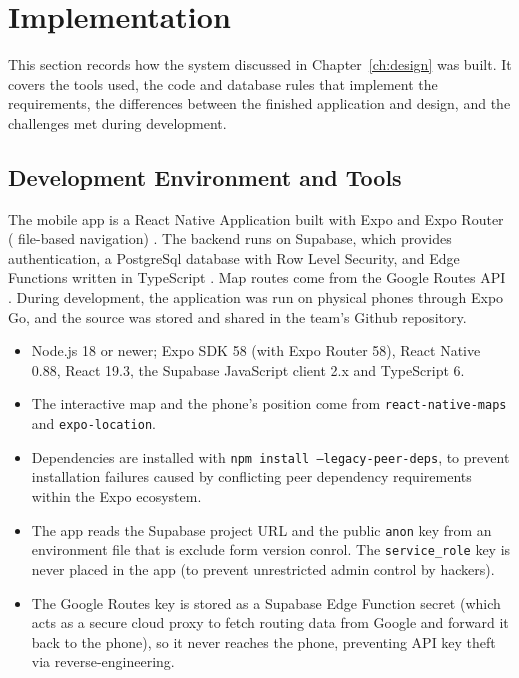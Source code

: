 \chapter{Implementation}
\label{ch:implementation}

This section records how the system discussed in Chapter~\ref{ch:design} was built. It covers the tools used, the code and database rules that implement the requirements, the differences between the finished application and design, and the challenges met during development.

\section{Development Environment and Tools}

The mobile app is a React Native Application built with Expo and Expo Router ( file-based navigation) \citep{expo2026,meta2026}. The backend runs on Supabase, which provides authentication, a PostgreSql database with Row Level Security, and Edge Functions written in TypeScript \citep{supabase2026}. Map routes come from the Google Routes API \citep{google2026a}. During development, the application was run on physical phones through Expo Go, and the source was stored and shared in the team's Github repository.

\begin{itemize}
	\item Node.js 18 or newer; Expo SDK 58 (with Expo Router 58), React Native 0.88, React 19.3, the  Supabase JavaScript client 2.x and TypeScript 6.
	\item The interactive map and the phone's position come from \texttt{react-native-maps} and \texttt{expo-location}.
	\item Dependencies are installed with \texttt{npm install --legacy-peer-deps}, to prevent installation failures caused by conflicting peer dependency requirements within the Expo ecosystem. 
	\item The app reads the Supabase project URL and the public \texttt{anon} key from an environment file that is exclude form version conrol. The \texttt{service\_role} key is never placed in the app (to prevent unrestricted admin control by hackers).
	\item The Google Routes key is stored as a Supabase Edge Function secret (which acts as a secure cloud proxy to fetch routing data from Google and forward it back to the phone), so it never reaches the phone, preventing API key theft via reverse-engineering.
	\end{itemize}
	
